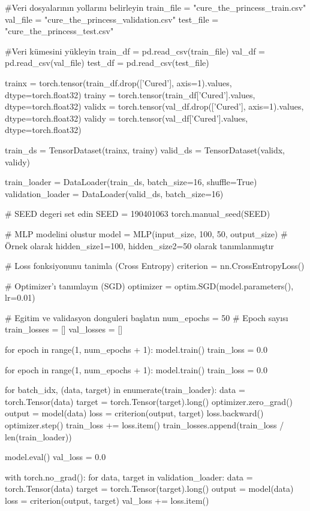 \documentclass[11pt]{article}
\begin{document}
\begin{python}
#Veri dosyalarının yollarını belirleyin
train_file = "cure_the_princess_train.csv"
val_file = "cure_the_princess_validation.csv"
test_file = "cure_the_princess_test.csv"


#Veri kümesini yükleyin
train_df = pd.read_csv(train_file)
val_df = pd.read_csv(val_file)
test_df = pd.read_csv(test_file)

trainx = torch.tensor(train_df.drop(['Cured'], axis=1).values, dtype=torch.float32)
trainy = torch.tensor(train_df['Cured'].values, dtype=torch.float32)
validx = torch.tensor(val_df.drop(['Cured'], axis=1).values, dtype=torch.float32)
validy = torch.tensor(val_df['Cured'].values, dtype=torch.float32)

train_ds = TensorDataset(trainx, trainy)
valid_ds = TensorDataset(validx, validy)

train_loader = DataLoader(train_ds, batch_size=16, shuffle=True)
validation_loader = DataLoader(valid_ds, batch_size=16)

# SEED degeri set edin
SEED = 190401063
torch.manual_seed(SEED)

# MLP modelini olustur
model = MLP(input_size, 100, 50, output_size)  # Örnek olarak hidden_size1=100, hidden_size2=50 olarak tanımlanmıştır

# Loss fonksiyonunu tanimla (Cross Entropy)
criterion = nn.CrossEntropyLoss()

# Optimizer'ı tanımlayın (SGD)
optimizer = optim.SGD(model.parameters(), lr=0.01)

# Egitim ve validasyon donguleri başlatın
num_epochs = 50  # Epoch sayısı
train_losses = []
val_losses = []



for epoch in range(1, num_epochs + 1):
    model.train()
    train_loss = 0.0
    
for epoch in range(1, num_epochs + 1):
    model.train()
    train_loss = 0.0
    

    for batch_idx, (data, target) in enumerate(train_loader):
        data = torch.Tensor(data)
        target = torch.Tensor(target).long()
        optimizer.zero_grad()       
        output = model(data)
        loss = criterion(output, target)
        loss.backward()
        optimizer.step()
        train_loss += loss.item()
    train_losses.append(train_loss / len(train_loader))
    
    model.eval()
    val_loss = 0.0
    

    with torch.no_grad():
        for data, target in validation_loader:
            data = torch.Tensor(data)
            target = torch.Tensor(target).long()
            output = model(data)
            loss = criterion(output, target)
            val_loss += loss.item()
    

\end{python}
\end{document}
